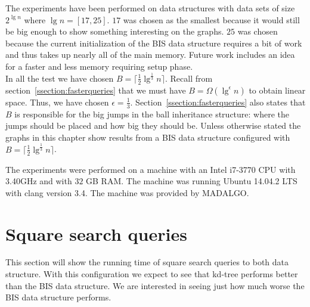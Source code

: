 The experiments have been performed on data structures with data sets of size $2^{\lg n}$ where $\lg n = [17,25]$. $17$ was chosen as the smallest because it would still be big enough to show something interesting on the graphs. $25$ was chosen because the current initialization of the BIS data structure requires a bit of work and thus takes up nearly all of the main memory. Future work includes an idea for a faster and less memory requiring setup phase.\\

In all the test we have chosen $B = \lceil \frac{1}{2}\lg^{\frac{1}{3}} n \rceil$. Recall from section~\ref{ssection:fasterqueries} that we must have $B = \Omega(\lg^\epsilon n)$ to obtain linear space. Thus, we have chosen $\epsilon = \frac{1}{3}$. Section~\ref{ssection:fasterqueries} also states that $B$ is responsible for the big jumps in the ball inheritance structure: where the jumps should be placed and how big they should be. Unless otherwise stated the graphs in this chapter show results from a BIS data structure configured with $B = \lceil \frac{1}{2}\lg^{\frac{1}{3}} n \rceil$.


The experiments were performed on a machine with an Intel i7-3770 CPU with 3.40GHz and with $32$ GB RAM. The machine was running Ubuntu 14.04.2 LTS with clang version 3.4. The machine was provided by MADALGO.



\section{Square search queries}
\label{sect:squares}

This section will show the running time of square search queries to both data structure. With this configuration we expect to see that kd-tree performs better than the BIS data structure. We are interested in seeing just how much worse the BIS data structure performs. 

